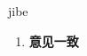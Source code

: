 
\begin{frame}
{\huge jibe}
\begin{center}
\begin{enumerate}\Large
  \item \textbf{意见一致}
\end{enumerate}
\end{center}
\end{frame}
